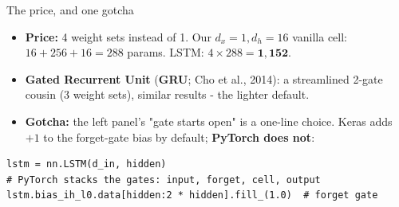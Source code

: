 \documentclass[aspectratio=169]{beamer}
\begin{document}
\begin{frame}[fragile]{The price, and one gotcha}
  \begin{itemize}
    \item \textbf{Price:} 4 weight sets instead of 1. Our $d_x{=}1,d_h{=}16$ vanilla
      cell: $16{+}256{+}16=288$ params. LSTM: $4\times288=\mathbf{1{,}152}$.
    \item \textbf{Gated Recurrent Unit} (\textbf{GRU}; Cho et al., 2014): a streamlined
      2-gate cousin (3 weight sets), similar results - the lighter default.
    \item \textbf{Gotcha:} the left panel's "gate starts open" is a one-line choice.
      Keras adds $+1$ to the forget-gate bias by default; \textbf{PyTorch does not}:
  \end{itemize}
  \small
\begin{verbatim}
lstm = nn.LSTM(d_in, hidden)
# PyTorch stacks the gates: input, forget, cell, output
lstm.bias_ih_l0.data[hidden:2 * hidden].fill_(1.0)  # forget gate
\end{verbatim}
\end{frame}
\end{document}
